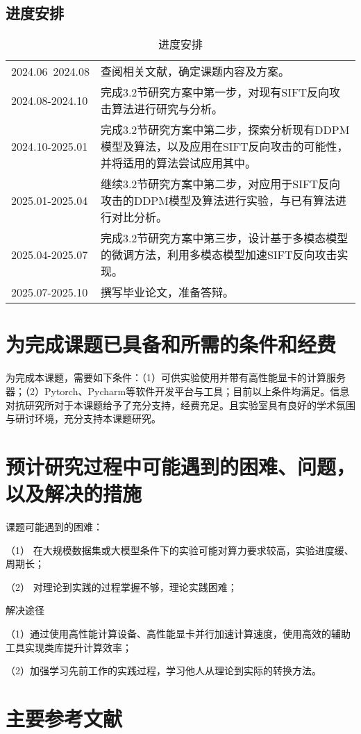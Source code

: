 \subsection{进度安排}
\begin{table}[h]
  \centering
  \caption{进度安排}\label{table3}
  \begin{tabularx}{0.8\textwidth}{lX}
    \toprule
    2024.06~2024.08 & 查阅相关文献，确定课题内容及方案。\\
    2024.08-2024.10 & 完成3.2节研究方案中第一步，对现有SIFT反向攻击算法进行研究与分析。\\
    2024.10-2025.01	& 完成3.2节研究方案中第二步，探索分析现有DDPM模型及算法，以及应用在SIFT反向攻击的可能性，并将适用的算法尝试应用其中。\\
    2025.01-2025.04 & 继续3.2节研究方案中第二步，对应用于SIFT反向攻击的DDPM模型及算法进行实验，与已有算法进行对比分析。\\
    2025.04-2025.07 & 完成3.2节研究方案中第三步，设计基于多模态模型的微调方法，利用多模态模型加速SIFT反向攻击实现。\\
    2025.07-2025.10 & 撰写毕业论文，准备答辩。\\
    \bottomrule
    \end{tabularx}
\end{table}
\section{为完成课题已具备和所需的条件和经费}
为完成本课题，需要如下条件：（1）可供实验使用并带有高性能显卡的计算服务器；（2）Pytorch、Pycharm等软件开发平台与工具；目前以上条件均满足。信息对抗研究所对于本课题给予了充分支持，经费充足。且实验室具有良好的学术氛围与研讨环境，充分支持本课题研究。
\section{预计研究过程中可能遇到的困难、问题，以及解决的措施}
课题可能遇到的困难：
\par （1） 在大规模数据集或大模型条件下的实验可能对算力要求较高，实验进度缓、周期长；
\par （2） 对理论到实践的过程掌握不够，理论实践困难；
\par 解决途径
\par （1）通过使用高性能计算设备、高性能显卡并行加速计算速度，使用高效的辅助工具实现类库提升计算效率；
\par （2）加强学习先前工作的实践过程，学习他人从理论到实际的转换方法。
\section{主要参考文献}



